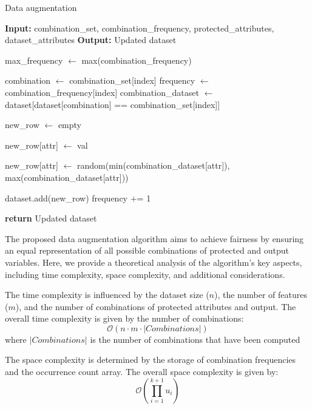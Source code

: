 \begin{algorithm}[H]
    \caption{Data augmentation}
    \begin{algorithmic}[1]
        \State \textbf{Input:} combination\_set, combination\_frequency, protected\_attributes, dataset\_attributes
        \State \textbf{Output:} Updated dataset

        \State max\_frequency $\gets$ max(combination\_frequency)

            \State combination $\gets$ combination\_set[index]
            \State frequency $\gets$ combination\_frequency[index]
            \State combination\_dataset $\gets$ dataset[dataset[combination] == combination\_set[index]]

                \State new\_row $\gets$ empty

                    \State new\_row[attr] $\gets$ val
                \EndFor

                    \State new\_row[attr] $\gets$ random(min(combination\_dataset[attr]), max(combination\_dataset[attr]))
                \EndFor

                \State dataset.add(new\_row)
                \State frequency $+$= 1
            \EndWhile
        \EndFor

        \State \textbf{return} Updated dataset
    \end{algorithmic}
\end{algorithm}

The proposed data augmentation algorithm aims to achieve fairness by ensuring an equal representation of all possible combinations of protected and output variables. Here, we provide a theoretical analysis of the algorithm's key aspects, including time complexity, space complexity, and additional considerations.

The time complexity is influenced by the dataset size ($n$), the number of features ($m$), and the number of combinations of protected attributes and output. The overall time complexity is given by the number of combinations:
\[
\mathcal{O}(n \cdot m \cdot |Combinations|)
\]
where $|Combinations|$ is the number of combinations that have been computed

The space complexity is determined by the storage of combination frequencies and the occurrence count array. The overall space complexity is given by:
\[
\mathcal{O}(\prod_{i=1}^{k+1} u_i)
\]

